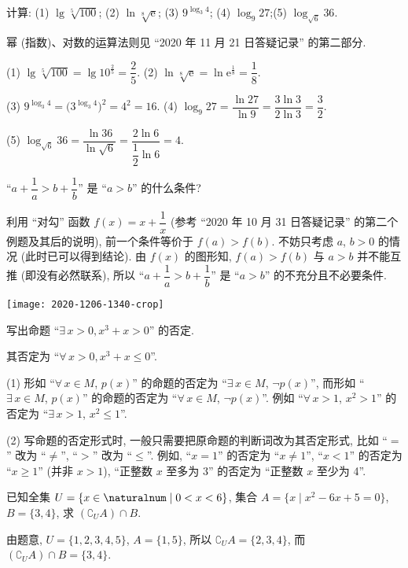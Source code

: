 \begin{example}
    计算: (1) $\lg \sqrt[5]{100}$;\quad 
    (2) $\ln\sqrt[8]{\mathrm{e}}$;\quad
    (3) $9^{\log_3 4}$;\quad
    (4) $\log_9 27$;\quad (5) $\log_{\sqrt 6}36$.
\end{example}
\begin{solution}
    幂 (指数)、对数的运算法则见 ``2020 年 11 月 21 日答疑记录'' 的第二部分.
    
    (1) $\lg \sqrt[5]{100}= \lg 10^{\frac25}= \dfrac25$.\qquad
    (2) $\ln\sqrt[8]{\mathrm{e}}= \ln \mathrm{e}^{\frac18}= \dfrac18$.

    (3) $9^{\log_3 4}= \big(3^{\log_3 4}\bigr)^2= 4^2= 16$.\qquad
    (4) $\log_9 27= \dfrac{\ln 27}{\ln9}
        = \dfrac{3\ln3}{2\ln3}= \dfrac32$.
    
    (5) $\log_{\sqrt6}36= \dfrac{\ln 36}{\ln \sqrt6}
        = \dfrac{2\ln6}{\dfrac12\ln6}= 4$.
\end{solution}

\begin{example}
    ``$a+\dfrac1a>b+\dfrac1b$'' 是 ``$a>b$'' 的什么条件?
\end{example}
\begin{solution}
    利用 ``对勾'' 函数 $f(x)=x+\dfrac1x$ (参考 ``2020 年 10 月 31 日答疑记录'' 的第二个例题及其后的说明), 前一个条件等价于 $f(a)>f(b)$. 不妨只考虑 $a$, $b>0$ 的情况 (此时已可以得到结论). 由 $f(x)$ 的图形知, $f(a)>f(b)$ 与 $a>b$ 并不能互推 (即没有必然联系), 所以 ``$a+\dfrac1a>b+\dfrac1b$'' 是 ``$a>b$'' 的不充分且不必要条件.
    
    \begin{center}
        \texttt{[image: 2020-1206-1340-crop]}
    \end{center}
\end{solution}

\begin{example}
    写出命题 ``$\exists\, x>0, x^3+x>0$'' 的否定.
\end{example}
\begin{solution}
    其否定为 ``$\forall\, x>0, x^3+x\leqslant 0$''.
\end{solution}

\begin{remark}
    (1) 形如 ``$\forall\, x\in M$, $p(x)$'' 的命题的否定为 ``$\exists\, x\in M$, $\neg p(x)$'', 而形如 ``$\exists\, x\in M$, $p(x)$'' 的命题的否定为 ``$\forall\, x\in M$, $\neg p(x)$''. 例如 ``$\forall\, x>1$, $x^2>1$'' 的否定为 ``$\exists\, x>1$, $x^2\leqslant 1$''.
    
    (2) 写命题的否定形式时, 一般只需要把原命题的判断词改为其否定形式, 比如 ``$=$'' 改为 ``$\neq$'', ``$>$'' 改为 ``$\leqslant$''. 例如, ``$x=1$'' 的否定为 ``$x\neq 1$'', ``$x<1$'' 的否定为 ``$x\geqslant 1$'' (并非 $x>1$), ``正整数 $x$ 至多为 $3$'' 的否定为 ``正整数 $x$ 至少为 4''.
\end{remark}

\begin{example}
    已知全集 $U=\{x\in\naturalnum\mid 0<x<6\}$, 集合 $A=\{x\mid x^2-6x+5=0\}$, $B=\{3,4\}$, 求 $(\complement_U A)\cap B$.
\end{example}
\begin{solution}
    由题意, $U=\{1,2,3,4,5\}$, $A=\{1,5\}$, 所以 $\complement_U A= \{2,3,4\}$, 而 $(\complement_U A)\cap B= \{3,4\}$.
\end{solution}